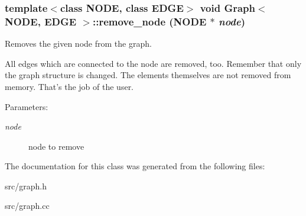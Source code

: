 \subsubsection{\setlength{\rightskip}{0pt plus 5cm}template$<$class NODE, class EDGE$>$ void {\bf Graph}$<$ NODE, EDGE $>$::remove\_\-node (NODE $\ast$ {\em node})}\label{classGraph_Grapha5}


Removes the given node from the graph. 

All edges which are connected to the node are removed, too. Remember that only the graph structure is changed. The elements themselves are not removed from memory. That's the job of the user. \begin{Desc}
\item[Parameters:]
\begin{description}
\item[{\em node}]node to remove\end{description}
\end{Desc}


The documentation for this class was generated from the following files:\begin{CompactItemize}
\item 
src/graph.h\item 
src/graph.cc\end{CompactItemize}
